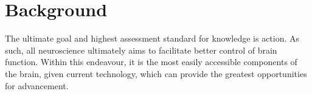 \section{Background}

The ultimate goal and highest assessment standard for knowledge is action.
As such, all neuroscience ultimately aims to facilitate better control of brain function.
Within this endeavour, it is the most easily accessible components of the brain, given current technology, which can provide the greatest opportunities for advancement.
